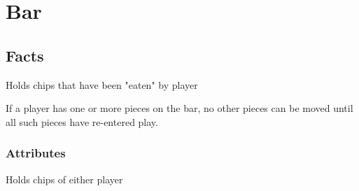 \section{Bar}

\subsection{Facts}
\begin{dashed}
	\item Holds chips that have been "eaten" by player
	\item If a player has one or more pieces on the bar,
	 no other pieces can be moved until all such pieces
	 have re-entered play.
\end{dashed}

\subsubsection{Attributes}
\begin{dashed}
	\item Holds chips of either player
\end{dashed}

